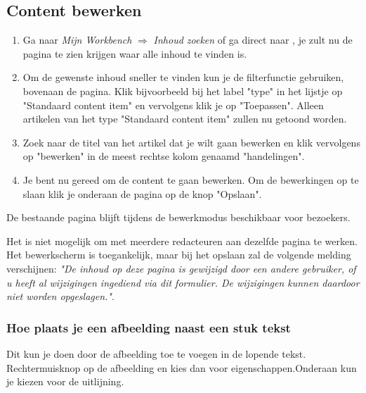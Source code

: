 \subsection{Content bewerken}


\begin{enumerate}
\item Ga naar \emph{Mijn Workbench} $\Rightarrow$ \emph{Inhoud zoeken} of ga direct naar , je zult nu de pagina te zien krijgen waar alle inhoud te vinden is.
\item Om de gewenste inhoud sneller te vinden kun je de filterfunctie gebruiken, bovenaan de pagina. Klik bijvoorbeeld bij het label "type" in het lijstje op "Standaard content item" en vervolgens klik je op "Toepassen". Alleen artikelen van het type "Standaard content item" zullen nu getoond worden.
\item Zoek naar de titel van het artikel dat je wilt gaan bewerken en klik vervolgens op "bewerken" in de meest rechtse kolom genaamd "handelingen".
\item Je bent nu gereed om de content te gaan bewerken. Om de bewerkingen op te slaan klik je onderaan de pagina op de knop "Opslaan".
\end{enumerate}

De bestaande pagina blijft tijdens de bewerkmodus beschikbaar voor bezoekers.

Het is niet mogelijk om met meerdere redacteuren aan dezelfde pagina te werken. Het bewerkscherm is toegankelijk, maar bij het opslaan zal de volgende melding verschijnen: \emph{"De inhoud op deze pagina is gewijzigd door een andere gebruiker, of u heeft al wijzigingen ingediend via dit formulier. De wijzigingen kunnen daardoor niet worden opgeslagen."}.

\subsubsection{Hoe plaats je een afbeelding naast een stuk tekst}
Dit kun je doen door de afbeelding toe te voegen in de lopende tekst. Rechtermuisknop op de afbeelding en kies dan voor eigenschappen.Onderaan kun je kiezen voor de uitlijning.
